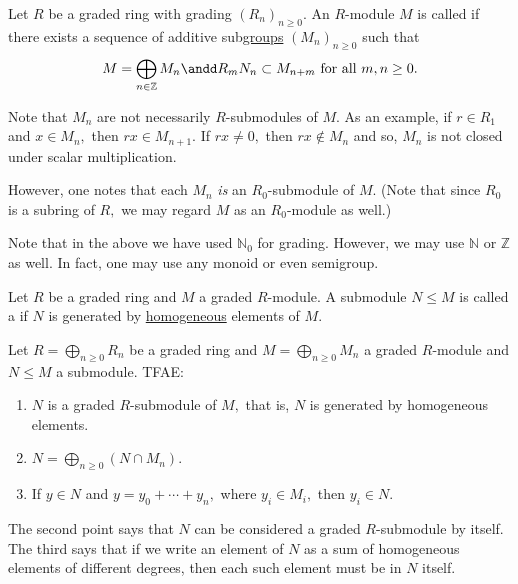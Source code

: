 \documentclass[12pt]{article}	%
\begin{document}
\begin{defn}%
	Let $R$ be a graded ring with grading $(R_n)_{n \ge 0}.$ An $R$-module $M$ is called  if there exists a sequence of additive sub\underline{groups} $(M_n)_{n \ge 0}$ such that
	\begin{equation*} 
		M = \bigoplus_{n \in \mathbb{Z}}M_n \andd R_mN_n \subset M_{n + m} \text{ for all }m, n \ge 0.
	\end{equation*}
\end{defn}
\begin{rem}
	Note that $M_n$ are not necessarily $R$-submodules of $M.$ As an example, if $r \in R_1$ and $x \in M_n,$ then $rx \in M_{n + 1}.$ If $rx \neq 0,$ then $rx \notin M_n$ and so, $M_n$ is not closed under scalar multiplication.

	However, one notes that each $M_n$ \emph{is} an $R_0$-submodule of $M.$ (Note that since $R_0$ is a subring of $R,$ we may regard $M$ as an $R_0$-module as well.)
\end{rem}

Note that in the above we have used $\mathbb{N}_0$ for grading. However, we may use $\mathbb{N}$ or $\mathbb{Z}$ as well. In fact, one may use any monoid or even semigroup. 

\begin{defn}%
	Let $R$ be a graded ring and $M$ a graded $R$-module. A submodule $N \le M$ is called a  if $N$ is generated by \underline{homogeneous} elements of $M.$
\end{defn}

\begin{thm} \label{thm:chargradedsubmodules}
	Let $R = \bigoplus_{n \ge 0} R_n$ be a graded ring and $M = \bigoplus_{n \ge 0}M_n$ a graded $R$-module and $N \le M$ a submodule. TFAE:
	\begin{enumerate}
		\item $N$ is a graded $R$-submodule of $M,$ that is, $N$ is generated by homogeneous elements.
		\item $N = \bigoplus_{n \ge 0}(N \cap M_n).$
		\item If $y \in N$ and $y = y_0 + \cdots + y_n,$ where $y_i \in M_i,$ then $y_i \in N.$
	\end{enumerate}
\end{thm}

The second point says that $N$ can be considered a graded $R$-submodule by itself. The third says that if we write an element of $N$ as a sum of homogeneous elements of different degrees, then each such element must be in $N$ itself.
\end{document}
